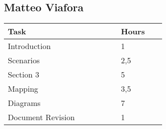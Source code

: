 \subsection{Matteo Viafora}
\begin{center}
\centering
    \begin{tabular}{@{}p{0.5\linewidth} p{0.2\linewidth}@{}}
        \hline
        \textbf{Task} & \textbf{Hours} \\ \hline
        Introduction & 1 \\ \hline
        Scenarios & 2,5 \\ \hline
        Section 3 & 5\\ \hline
        Mapping & 3,5\\ \hline
        Diagrams & 7\\ \hline
        Document Revision & 1\\ \hline
    \end{tabular}
\end{center}